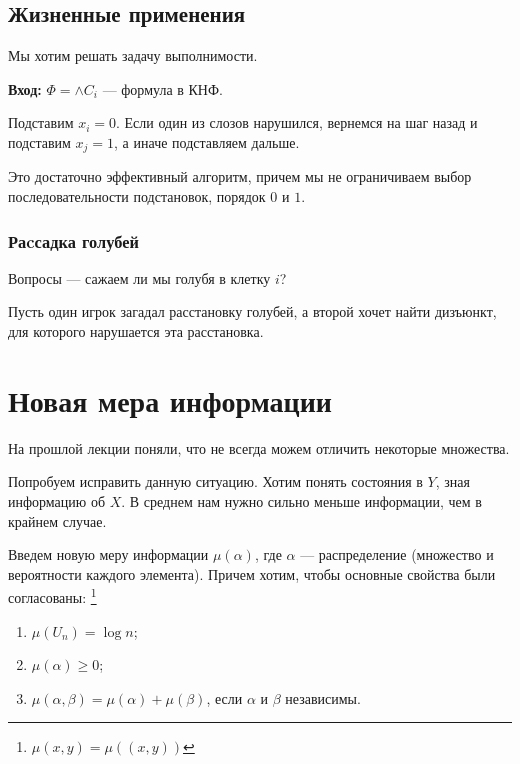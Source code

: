 \subsection{Жизненные применения}
Мы хотим решать задачу выполнимости.

\textbf{Вход:} $ \Phi = \wedge C_i $  --- формула в КНФ.

Подставим $ x_i = 0$. Если один из слозов нарушился, вернемся на шаг назад и подставим $  x_j = 1$, а иначе подставляем дальше.

\begin{figure}[ht]
    \centering
    \label{fig:cnf-algo}
\end{figure}

Это достаточно эффективный алгоритм, причем мы не ограничиваем выбор последовательности подстановок, порядок $ 0$ и $ 1$.

\subsubsection{Раcсадка голубей}
\begin{figure}[ht]
    \centering
    \label{fig:golub-img}
\end{figure}
Вопросы --- сажаем ли мы голубя в клетку $ i$?

Пусть один игрок загадал расстановку голубей, а второй хочет найти дизъюнкт, для которого нарушается эта расстановка.



\section{Новая мера информации}
На прошлой лекции поняли, что не всегда можем отличить некоторые множества.

Попробуем исправить данную ситуацию. Хотим понять состояния в $ Y$, зная информацию об $ X$. В среднем нам нужно сильно меньше информации, чем в крайнем случае.

Введем новую меру информации $  \mu ( \alpha )$, где $  \alpha $ --- распределение (множество и вероятности каждого элемента). Причем хотим, чтобы основные свойства были согласованы: \footnote{$ \mu(x, y) = \mu((x, y))$}
\begin{enumerate}
	\item $  \mu(U_n) = \log n$;
	\item $ \mu( \alpha ) \ge 0$;
	\item $\mu ( \alpha,  \beta ) = \mu ( \alpha ) + \mu ( \beta )$, если  $  \alpha $ и $  \beta $ независимы.
\end{enumerate} 

